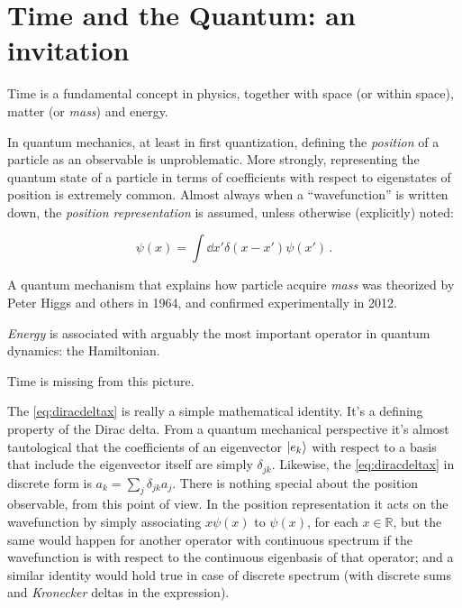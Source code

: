 \section{Time and the Quantum: an invitation}

Time is a fundamental concept in physics, together with space (or  within space),
matter (or \emph{mass}) and energy.

In quantum mechanics, at least in first quantization, defining the \emph{position} of a particle as
an observable is unproblematic. More strongly, representing the quantum state of a particle
in terms of coefficients with respect to eigenstates of position is extremely common.
Almost always when a ``wavefunction'' is written down, the \emph{position representation}
is assumed, unless otherwise (explicitly) noted:

\begin{equation}\label{eq:diracdeltax}
  \psi(x) = \int \dd{x'} \delta(x-x') \psi(x') \,\text{.}
\end{equation}

A quantum mechanism that explains how particle acquire \emph{mass} was theorized by
Peter Higgs and others in 1964, and confirmed experimentally in 2012.

\emph{Energy} is associated with arguably the most important operator in quantum dynamics: the Hamiltonian.

Time is missing from this picture.

The \eqref{eq:diracdeltax} is really a simple mathematical identity.
It's a defining property of the Dirac delta.
From a quantum mechanical perspective it's almost tautological
that the coefficients of an eigenvector $\ket{e_k}$ with respect to a basis
that include the eigenvector itself are simply $\delta_{jk}$.
Likewise, the \eqref{eq:diracdeltax} in discrete form is $a_k = \sum_j \delta_{jk} a_j$.
There is nothing special about the position observable, from this point of view.
In the position representation it acts on the wavefunction by simply
associating $x\psi(x)$ to $\psi(x)$, for each $x \in \mathbb{R}$,
but the same would happen for another operator with continuous spectrum
if the wavefunction is with respect to the continuous eigenbasis
of that operator; and a similar identity
would hold true in case of discrete spectrum
(with discrete sums and \emph{Kronecker} deltas in the expression).